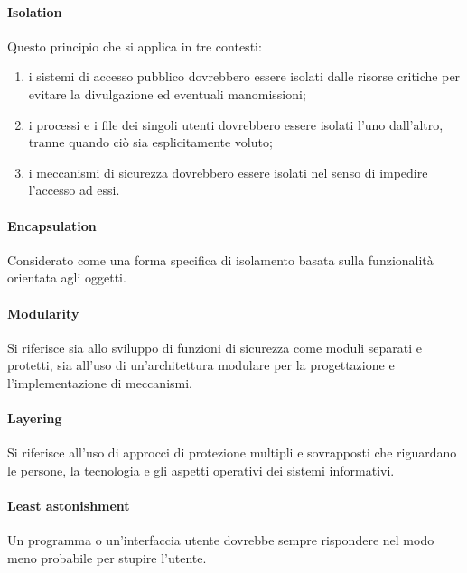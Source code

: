 \paragraph{Isolation}
Questo principio che si applica in tre contesti:
\begin{enumerate}
    \item i sistemi di accesso pubblico dovrebbero essere isolati dalle
          risorse critiche per evitare la
          divulgazione ed eventuali manomissioni;
    \item i processi e i file dei singoli utenti dovrebbero essere isolati
          l'uno dall'altro, tranne quando
          ciò sia esplicitamente voluto;
    \item i meccanismi di sicurezza dovrebbero essere isolati nel senso di
          impedire l'accesso ad essi.
\end{enumerate}

\paragraph{Encapsulation}
Considerato come una forma specifica di isolamento basata sulla funzionalità
orientata agli oggetti.

\paragraph{Modularity}
Si riferisce sia allo sviluppo di funzioni di sicurezza come moduli separati e
protetti, sia all'uso di
un'architettura modulare per la progettazione e l'implementazione di meccanismi.

\paragraph{Layering}
Si riferisce all'uso di approcci di protezione multipli e sovrapposti che
riguardano le persone, la
tecnologia e gli aspetti operativi dei sistemi informativi.

\paragraph{Least astonishment}
Un programma o un'interfaccia utente dovrebbe sempre rispondere nel modo meno
probabile per stupire l'utente.

